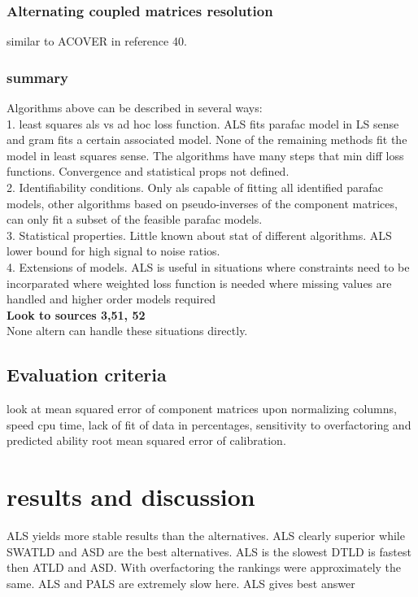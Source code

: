 \documentclass[10pt, draft]{article}
\begin{document}
\subsubsection{Alternating coupled matrices resolution}
similar to ACOVER in reference 40.

\subsubsection{summary}

Algorithms above can be described in several ways:\\
1. least squares als vs ad hoc loss function. ALS fits parafac model in LS sense and gram fits a certain associated model.  None of the remaining methods fit the model in least squares sense.  The algorithms have many steps that min diff loss functions.  Convergence and statistical props not defined.  \\
2. Identifiability conditions.  Only als capable of fitting all identified parafac models, other algorithms based on pseudo-inverses of the component matrices, can only fit a subset of the feasible parafac models.  \\
3. Statistical properties.  Little known about stat of different algorithms.  ALS lower bound for high signal to noise ratios.  \\
4. Extensions of models.  ALS is useful in situations where constraints need to be incorparated where weighted loss function is needed where missing values are handled and higher order models required \\
\textbf{Look to sources 3,51, 52}\\
None altern can handle these situations directly.

\subsection{Evaluation criteria} 
look at mean squared error of component matrices upon normalizing columns, speed cpu time, lack of fit of data in percentages, sensitivity to overfactoring and predicted ability root mean squared error of calibration.

\section{results and discussion}

ALS yields more stable results than the alternatives.  ALS clearly superior while SWATLD and ASD are the best alternatives.  ALS is the slowest DTLD is fastest then ATLD and ASD.  With overfactoring the rankings were approximately the same.  ALS and PALS are extremely slow here.  ALS gives best answer
\end{document}
